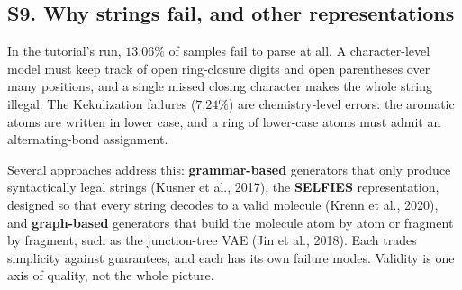 \documentclass[11pt]{article}
\begin{document}
\label{sec:S9}
\subsection*{S9. Why strings fail, and other representations}
In the tutorial's run, $13.06\%$ of samples fail to parse at all. A character-level model must keep track of open ring-closure digits and open parentheses over many positions, and a single missed closing character makes the whole string illegal. The Kekulization failures ($7.24\%$) are chemistry-level errors: the aromatic atoms are written in lower case, and a ring of lower-case atoms must admit an alternating-bond assignment.

Several approaches address this: \textbf{grammar-based} generators that only produce syntactically legal strings (Kusner et al., 2017), the \textbf{SELFIES} representation, designed so that every string decodes to a valid molecule (Krenn et al., 2020), and \textbf{graph-based} generators that build the molecule atom by atom or fragment by fragment, such as the junction-tree VAE (Jin et al., 2018). Each trades simplicity against guarantees, and each has its own failure modes. Validity is one axis of quality, not the whole picture.
\end{document}
